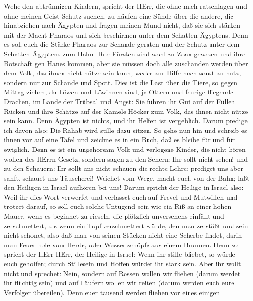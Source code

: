  Wehe den abtrünnigen Kindern, spricht der HErr, die ohne
mich ratschlagen und ohne meinen Geist Schutz suchen, zu häufen eine
Sünde über die andere,  die hinabziehen nach Ägypten und
fragen meinen Mund nicht, daß sie sich stärken mit der Macht Pharaos und
sich beschirmen unter dem Schatten Ägyptens.  Denn es soll
euch die Stärke Pharaos zur Schande geraten und der Schutz unter dem
Schatten Ägyptens zum Hohn.  Ihre Fürsten sind wohl zu Zoan
gewesen und ihre Botschaft gen Hanes kommen,  aber sie
müssen doch alle zuschanden werden über dem Volk, das ihnen nicht nütze
sein kann, weder zur Hilfe noch sonst zu nutz, sondern nur zur Schande
und Spott.  Dies ist die Last über die Tiere, so gegen
Mittag ziehen, da Löwen und Löwinnen sind, ja Ottern und feurige
fliegende Drachen, im Lande der Trübsal und Angst: Sie führen ihr Gut
auf der Füllen Rücken und ihre Schätze auf der Kamele Höcker zum Volk,
das ihnen nicht nütze sein kann.  Denn Ägypten ist nichts,
und ihr Helfen ist vergeblich. Darum predige ich davon also: Die Rahab
wird stille dazu sitzen.  So gehe nun hin und schreib es
ihnen vor auf eine Tafel und zeichne es in ein Buch, daß es bleibe für
und für ewiglich.  Denn es ist ein ungehorsam Volk und
verlogene Kinder, die nicht hören wollen des HErrn Gesetz, 
sondern sagen zu den Sehern: Ihr sollt nicht sehen! und zu den Schauern:
Ihr sollt uns nicht schauen die rechte Lehre; prediget uns aber sanft,
schauet uns Täuscherei!  Weichet vom Wege, macht euch von
der Bahn; laßt den Heiligen in Israel aufhören bei uns! 
Darum spricht der Heilige in Israel also: Weil ihr dies Wort verwerfet
und verlasset euch auf Frevel und Mutwillen und trotzet darauf,
 so soll euch solche Untugend sein wie ein Riß an einer
hohen Mauer, wenn es beginnet zu rieseln, die plötzlich unversehens
einfällt und zerschmettert,  als wenn ein Topf
zerschmettert würde, den man zerstößt und sein nicht schonet, also daß
man von seinen Stücken nicht eine Scherbe findet, darin man Feuer hole
vom Herde, oder Wasser schöpfe aus einem Brunnen.  Denn so
spricht der HErr HErr, der Heilige in Israel: Wenn ihr stille bliebet,
so würde euch geholfen; durch Stillesein und Hoffen würdet ihr stark
sein. Aber ihr wollt nicht  und sprechet: Nein, sondern auf
Rossen wollen wir fliehen (darum werdet ihr flüchtig sein) und auf
Läufern wollen wir reiten (darum werden euch eure Verfolger übereilen).
 Denn euer tausend werden fliehen vor eines einigen
